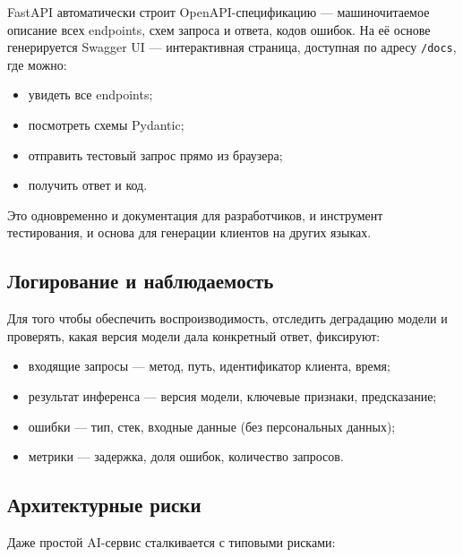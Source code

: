 \documentclass[12pt,a4paper]{article}
\begin{document}
FastAPI автоматически строит OpenAPI-спецификацию — машиночитаемое описание всех endpoints, схем запроса и ответа, кодов ошибок. На её основе генерируется Swagger UI — интерактивная страница, доступная по адресу \texttt{/docs}, где можно:

\begin{itemize}
    \item увидеть все endpoints;
    \item посмотреть схемы Pydantic;
    \item отправить тестовый запрос прямо из браузера;
    \item получить ответ и код.
\end{itemize}

Это одновременно и документация для разработчиков, и инструмент тестирования, и основа для генерации клиентов на других языках.

\subsection{Логирование и наблюдаемость}

Для того чтобы обеспечить воспроизводимость, отследить деградацию модели и проверять, какая версия модели дала конкретный ответ, фиксируют:

\begin{itemize}
    \item входящие запросы — метод, путь, идентификатор клиента, время;
    \item результат инференса — версия модели, ключевые признаки, предсказание;
    \item ошибки — тип, стек, входные данные (без персональных данных);
    \item метрики — задержка, доля ошибок, количество запросов.
\end{itemize}

\subsection{Архитектурные риски}

Даже простой AI-сервис сталкивается с типовыми рисками:
\end{document}
